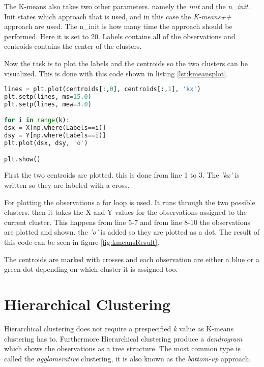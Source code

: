 The K-means also takes two other parameters. namely the \emph{init} and the \emph{n\_init}. Init states which approach that is used, and in this case the \emph{K-means++} approach are used. The n\_init is how many time the approach should be performed. Here it is set to 20.
Labels contains all of the observations and centroids contains the center of the clusters.

Now the task is to plot the labels and the centroids so the two clusters can be visualized. 
This is done with this code shown in listing \ref{lst:kmeansplot}.

\begin{lstlisting}[language=Python, label=lst:kmeansplot, caption=The code for plotting the two clusters]
lines = plt.plot(centroids[:,0], centroids[:,1], 'kx')
plt.setp(lines, ms=15.0)
plt.setp(lines, mew=3.0)

for i in range(k):
dsx = X[np.where(Labels==i)]
dsy = Y[np.where(Labels==i)]
plt.plot(dsx, dsy, 'o')

plt.show()
\end{lstlisting}

First the two centroids are plotted. this is done from line 1 to 3. The \emph{'kx'} is written so they are labeled with a cross.

For plotting the observations a for loop is used. It runs through the two possible clusters. then it takes the X and Y values for the observations assigned to the current cluster. This happens from line 5-7 and from line 8-10 the observations are plotted and shown. the \emph{'o'} is added so they are plotted as a dot. 
The result of this code can be seen in figure \ref{fig:kmeansResult}.


The centroids are marked with crosses and each observation are either a blue or a green dot depending on which cluster it is assigned too.


\section{Hierarchical Clustering}
Hierarchical clustering does not require a prespecified \emph{k} value as K-means clustering has to.
Furthermore Hierarchical clustering produce a \emph{dendrogram} which shows the observations as a tree structure.
The most common type is called the \emph{agglomerative} clustering, it is also known as the \emph{bottom-up} approach.

